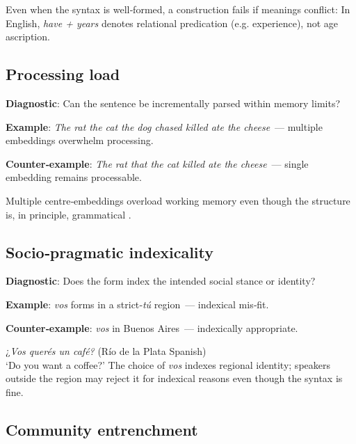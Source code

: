 \documentclass[12pt]{article}
\begin{document}
Even when the syntax is well‑formed, a construction fails if meanings conflict:
\z
In English, \textit{have + years} denotes relational predication (e.g. experience), not age ascription.

\subsection{Processing load}

\begin{tcolorbox}[colback=lsLightBlue!30]
\textbf{Diagnostic}: Can the sentence be incrementally parsed within memory limits?

\textbf{Example}: \textit{The rat the cat the dog chased killed ate the cheese}~— multiple embeddings overwhelm processing.

\textbf{Counter‑example}: \textit{The rat that the cat killed ate the cheese}~— single embedding remains processable.
\end{tcolorbox}

Multiple centre‑embeddings overload working memory even though the structure is, in principle, grammatical \autocite{gibson2000}.

\subsection{Socio‑pragmatic indexicality}

\begin{tcolorbox}[colback=lsLightBlue!30]
\textbf{Diagnostic}: Does the form index the intended social stance or identity?

\textbf{Example}: \textit{vos} forms in a strict‑\textit{tú} region~— indexical mis‑fit.

\textbf{Counter‑example}: \textit{vos} in Buenos Aires~— indexically appropriate.
\end{tcolorbox}

\ea
¿\textit{Vos querés un café?} (Río de la Plata Spanish)\\
`Do you want a coffee?'
\z
The choice of \textit{vos} indexes regional identity; speakers outside the region may reject it for indexical reasons even though the syntax is fine.

\subsection{Community entrenchment}
\end{document}
